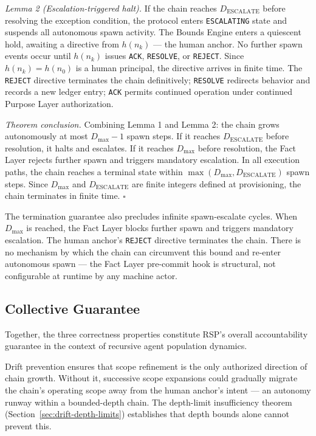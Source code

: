 \medskip
\textit{Lemma 2 (Escalation-triggered halt).} If the chain reaches $D_{\mathrm{ESCALATE}}$ before resolving the exception condition, the protocol enters \texttt{ESCALATING} state and suspends all autonomous spawn activity. The Bounds Engine enters a quiescent hold, awaiting a directive from $h(n_k)$ — the human anchor. No further spawn events occur until $h(n_k)$ issues \texttt{ACK}, \texttt{RESOLVE}, or \texttt{REJECT}. Since $h(n_k) = h(n_0)$ is a human principal, the directive arrives in finite time. The \texttt{REJECT} directive terminates the chain definitively; \texttt{RESOLVE} redirects behavior and records a new ledger entry; \texttt{ACK} permits continued operation under continued Purpose Layer authorization.

\medskip
\textit{Theorem conclusion.} Combining Lemma 1 and Lemma 2: the chain grows autonomously at most $D_{\mathrm{max}} - 1$ spawn steps. If it reaches $D_{\mathrm{ESCALATE}}$ before resolution, it halts and escalates. If it reaches $D_{\mathrm{max}}$ before resolution, the Fact Layer rejects further spawn and triggers mandatory escalation. In all execution paths, the chain reaches a terminal state within $\max(D_{\mathrm{max}}, D_{\mathrm{ESCALATE}})$ spawn steps. Since $D_{\mathrm{max}}$ and $D_{\mathrm{ESCALATE}}$ are finite integers defined at provisioning, the chain terminates in finite time. $\square$

The termination guarantee also precludes infinite spawn-escalate cycles. When $D_{\mathrm{max}}$ is reached, the Fact Layer blocks further spawn and triggers mandatory escalation. The human anchor's \texttt{REJECT} directive terminates the chain. There is no mechanism by which the chain can circumvent this bound and re-enter autonomous spawn — the Fact Layer pre-commit hook is structural, not configurable at runtime by any machine actor.

\subsection{Collective Guarantee}
\label{sec:rs-collective-guarantee}

Together, the three correctness properties constitute RSP's overall accountability guarantee in the context of recursive agent population dynamics.

Drift prevention ensures that scope refinement is the only authorized direction of chain growth. Without it, successive scope expansions could gradually migrate the chain's operating scope away from the human anchor's intent — an autonomy runway within a bounded-depth chain. The depth-limit insufficiency theorem (Section~\ref{sec:drift-depth-limits}) establishes that depth bounds alone cannot prevent this.

